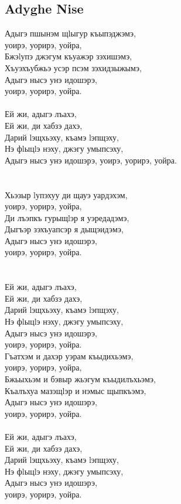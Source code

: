 \documentclass[a4paper,12pt]{book}
\newcommand{\1}[1]{\textbf{\emph{#1}}} %
\newcommand{\2}[1]{\textbf{[#1]}} %
\newcommand{\3}[1]{\fontsize{11pt}{0cm}\textbf{\emph{#1}}} %
\newcommand{\4}[1]{\fontsize{10pt}{0cm}\emph{#1}}	%
\newcommand{\5}[1]{\textbf{/#1/}} %
\newcommand{\6}[1]{\textbf{[#1]}} %
\newcommand{\7}[1]{\fontsize{12pt}{0cm}\emph{#1}} %
\newcommand{\8}[1]{\fontsize{12pt}{0cm}`#1'} %
\newcommand{\9}[1]{\fontsize{12pt}{0cm}(lit. `#1')} %
\begin{document}
\subsection{Adyghe Nise}

Адыгэ пшынэм щlыгур къыпэджэмэ, \\
уоирэ, уорирэ, уойра,\\
Бжэlупэ джэгум къуажэр зэхишэмэ,\\
Хъуэхъубжьэ усэр псэм зэхидзыжымэ,\\
Адыгэ нысэ унэ идошэрэ, \\
уоирэ, уорирэ, уойра.\\
\\
Ей жи, адыгэ лъахэ,\\
Ей жи, ди хабзэ дахэ,\\
Дарий lэщхьэху, къамэ lэпщэху,\\
Нэ фlыцlэ нэху, джэгу умыпсэху,\\
Адыгэ нысэ унэ идошэрэ, уоирэ, уорирэ, уойра.\\
\\\\
Хьэзыр lупэхуу ди щауэ уардэхэм,\\
уоирэ, уорирэ, уойра,\\
Ди лъэпкъ гурыщlэр я уэредадэмэ,\\
Дыгъэр зэхъуапсэр я дыщэидэмэ,\\
Адыгэ нысэ унэ идошэрэ,\\
уоирэ, уорирэ, уойра.\\
\\\\
Ей жи, адыгэ лъахэ,\\
Ей жи, ди хабзэ дахэ,\\
Дарий lэщхьэху, къамэ lэпщэху,\\
Нэ фlыцlэ нэху, джэгу умыпсэху,\\
Адыгэ нысэ унэ идошэрэ,\\
уоирэ, уорирэ, уойра.\\

Гъатхэм и дахэр уэрам къыдихьэмэ,\\
уоирэ, уорирэ, уойра,\\
Бжьыхьэм и бэвыр жьэгум къыдилъхьэмэ,\\
Къалъхуа мазэщlэр и нэмыс щыпкъэмэ,\\
Адыгэ нысэ унэ идошэрэ,\\
уоирэ, уорирэ, уойра.\\
\\
Ей жи, адыгэ лъахэ,\\
Ей жи, ди хабзэ дахэ,\\
Дарий lэщхьэху, къамэ lэпщэху,\\
Нэ фlыцlэ нэху, джэгу умыпсэху,\\
Адыгэ нысэ унэ идошэрэ,\\
уоирэ, уорирэ, уойра.\\
\end{document}
